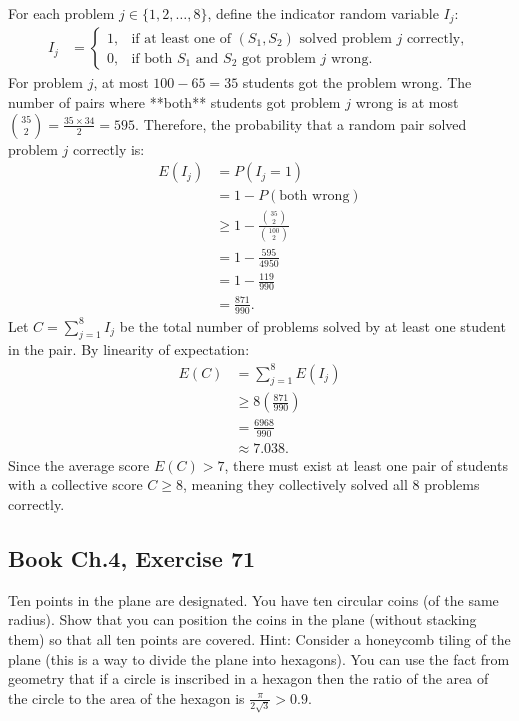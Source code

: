 \documentclass[11pt,a4paper]{article}
\begin{document}
For each problem $j \in \{1, 2, \dots, 8\}$, define the indicator random variable $I_j$:
\begin{align*}
I_j &= \begin{cases}
1, & \text{if at least one of } (S_1, S_2) \text{ solved problem } j \text{ correctly}, \\
0, & \text{if both } S_1 \text{ and } S_2 \text{ got problem } j \text{ wrong}.
\end{cases}
\end{align*}
For problem $j$, at most $100 - 65 = 35$ students got the problem wrong. The number of pairs where **both** students got problem $j$ wrong is at most $\binom{35}{2} = \frac{35 \times 34}{2} = 595$. Therefore, the probability that a random pair solved problem $j$ correctly is:
\begin{align*}
E(I_j) &= P(I_j = 1) \\
&= 1 - P(\text{both wrong}) \\
&\ge 1 - \frac{\binom{35}{2}}{\binom{100}{2}} \\
&= 1 - \frac{595}{4950} \\
&= 1 - \frac{119}{990} \\
&= \frac{871}{990}.
\end{align*}
Let $C = \sum_{j=1}^{8} I_j$ be the total number of problems solved by at least one student in the pair. By linearity of expectation:
\begin{align*}
E(C) &= \sum_{j=1}^{8} E(I_j) \\
&\ge 8 \left(\frac{871}{990}\right) \\
&= \frac{6968}{990} \\
&\approx 7.038.
\end{align*}
Since the average score $E(C) > 7$, there must exist at least one pair of students with a collective score $C \ge 8$, meaning they collectively solved all 8 problems correctly.

\vspace{10pt}
\subsection{Book Ch.4, Exercise 71}
\begin{tcolorbox}[title={Book Ch.4, Exercise 71}]
Ten points in the plane are designated. You have ten circular coins (of the same radius). Show that you can position the coins in the plane (without stacking them) so that all ten points are covered.
Hint: Consider a honeycomb tiling of the plane (this is a way to divide the plane into hexagons). You can use the fact from geometry that if a circle is inscribed in a hexagon then the ratio of the area of the circle to the area of the hexagon is $\frac{\pi}{2\sqrt{3}} > 0.9$.
\end{tcolorbox}
\end{document}
